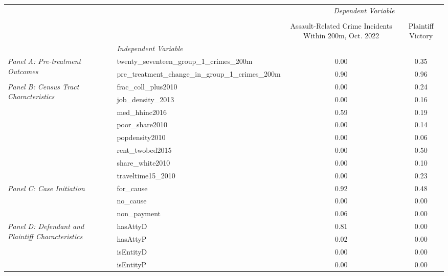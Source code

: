 \begin{tabular}{llcc}
\toprule
 &  & \multicolumn{2}{c}{\textit{Dependent Variable}} \\
\cline{3-4}
\\
 &  & Assault-Related Crime Incidents Within 200m, Oct. 2022 & Plaintiff Victory \\
 & \emph{Independent Variable} &  &  \\
\midrule
\multirow[c]{2}{3cm}{\textit{Panel A: Pre-treatment Outcomes}} & twenty_seventeen_group_1_crimes_200m & 0.00 & 0.35 \\
 & pre_treatment_change_in_group_1_crimes_200m & 0.90 & 0.96 \\
\cline{1-4}
\multirow[c]{8}{3cm}{\textit{Panel B: Census Tract Characteristics}} & frac_coll_plus2010 & 0.00 & 0.24 \\
 & job_density_2013 & 0.00 & 0.16 \\
 & med_hhinc2016 & 0.59 & 0.19 \\
 & poor_share2010 & 0.00 & 0.14 \\
 & popdensity2010 & 0.00 & 0.06 \\
 & rent_twobed2015 & 0.00 & 0.50 \\
 & share_white2010 & 0.00 & 0.10 \\
 & traveltime15_2010 & 0.00 & 0.23 \\
\cline{1-4}
\multirow[c]{3}{3cm}{\textit{Panel C: Case Initiation}} & for_cause & 0.92 & 0.48 \\
 & no_cause & 0.00 & 0.00 \\
 & non_payment & 0.06 & 0.00 \\
\cline{1-4}
\multirow[c]{4}{3cm}{\textit{Panel D: Defendant and Plaintiff Characteristics}} & hasAttyD & 0.81 & 0.00 \\
 & hasAttyP & 0.02 & 0.00 \\
 & isEntityD & 0.00 & 0.00 \\
 & isEntityP & 0.00 & 0.00 \\
\cline{1-4}
\bottomrule
\end{tabular}
